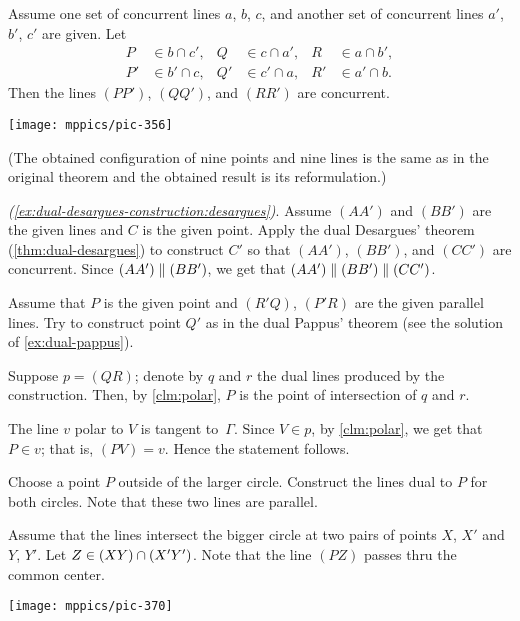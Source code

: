 Assume one set of concurrent lines $a$, $b$, $c$, 
and another set of concurrent lines $a'$, $b'$, $c'$ are given.
Let
\begin{align*}
P&\in b\cap c',
&
Q&\in c\cap a',
&
R&\in a\cap b',\\
P'&\in b'\cap c,
&
Q'&\in c'\cap a,
&
R'&\in a'\cap b.
\end{align*}
Then the lines $(PP')$, $(QQ')$, and $(RR')$ are concurrent.

\begin{Figure}
\vskip-0mm
\centering
\texttt{[image: mppics/pic-356]}
\vskip-0mm
\end{Figure}

(The obtained configuration of nine points and nine lines is the same as in the original theorem and the obtained result is its reformulation.)

\parbf{\ref{ex:dual-desargues-construction},} \textit{(\ref{ex:dual-desargues-construction:desargues})}.
Assume $(AA')$ and $(BB')$ are the given lines and $C$ is the given point.
Apply the dual Desargues' theorem (\ref{thm:dual-desargues}) to construct $C'$ so that $(AA')$, $(BB')$, and $(CC')$ are concurrent. 
Since $(AA')\parallel (BB')$, 
we get that 
$(AA')\parallel (BB')\parallel (CC')$.

 Assume that $P$ is the given point and $(R'Q)$, $(P'R)$ are the given parallel lines.
Try to construct point $Q'$ as in the dual Pappus' theorem (see the solution of \ref{ex:dual-pappus}).

 Suppose $p=(QR)$; denote by $q$ and $r$ the dual lines produced by the construction.
Then, by \ref{clm:polar}, $P$ is the point of intersection of $q$ and $r$.

The line $v$ polar to $V$ is tangent to~$\Gamma$.
Since $V\in p$, by \ref{clm:polar}, we get that $P\in v$;
that is, $(PV)=v$.
Hence the statement follows.

Choose a point $P$ outside of the larger circle.
Construct the lines dual to $P$ for both circles.
Note that these two lines are parallel. 

Assume that the lines intersect the bigger circle at two pairs of points $X$, $X'$ and $Y$, $Y'$.
Let $Z\in (XY)\cap (X'Y')$.
Note that the line $(PZ)$ passes thru the common center.

\begin{Figure}
\vskip-0mm
\centering
\texttt{[image: mppics/pic-370]}
\vskip-6mm
\end{Figure}

